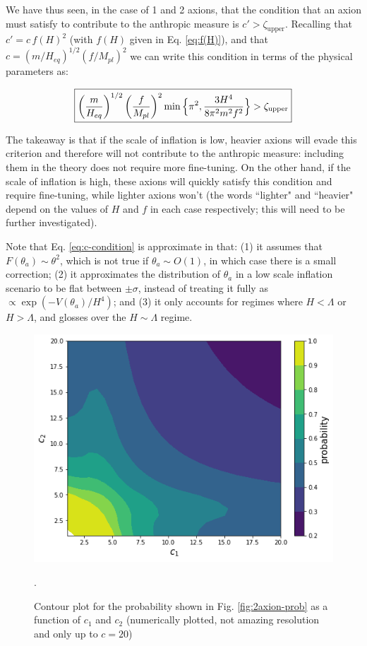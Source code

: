 \documentclass{article}
\begin{document}
We have thus seen, in the case of 1 and 2 axions, that the condition that an axion must satisfy to contribute to the anthropic measure is $c'>\zeta_\text{upper}$. Recalling that $c'=c\,f(H)^2$ (with $f(H)$ given in Eq. \eqref{eq:f(H)}), and that $c=(m/H_{eq})^{1/2}(f/M_{pl})^2$ we can write this condition in terms of the physical parameters as:

\begin{equation}
    \label{eq:c-condition}
    \boxed{\left(\frac{m}{H_{eq}}\right)^{1/2}\left(\frac{f}{M_{pl}}\right)^{2}\min{ \Bigl\{ \pi^2,\frac{3H^4}{8\pi^2m^2f^2}\Bigr\}}>\zeta_\text{upper}}
\end{equation}

The takeaway is that if the scale of inflation is low, heavier axions will evade this criterion and therefore will not contribute to the anthropic measure: including them in the theory does not require more fine-tuning. On the other hand, if the scale of inflation is high, these axions will quickly satisfy this condition and require fine-tuning, while lighter axions won't (the words ``lighter" and ``heavier" depend on the values of $H$ and $f$ in each case respectively; this will need to be further investigated).

Note that Eq. \eqref{eq:c-condition} is approximate in that: (1) it assumes that $F(\theta_a)\sim\theta^2$, which is not true if $\theta_a \sim O(1)$, in which case there is a small correction; (2) it approximates the distribution of $\theta_a$ in a low scale inflation scenario to be flat between $\pm \sigma$, instead of treating it fully as $\propto \exp{\left(-V(\theta_a)/H^4\right)}$; and (3) it only accounts for regimes where $H<\Lambda$ or $H>\Lambda$, and glosses over the $H\sim\Lambda$ regime.

\begin{figure}[h]
    \includegraphics[scale=0.6]{figs/2axion-contour.png}
    \centering
    \caption{Contour plot for the probability shown in Fig. \ref{fig:2axion-prob} as a function of $c_1$ and $c_2$ (numerically plotted, not amazing resolution and only up to $c=20$)}.
    \label{fig:2axion-contour}
\end{figure}
\end{document}
